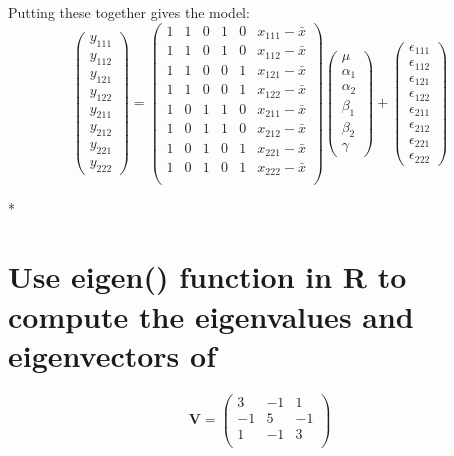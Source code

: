 \documentclass[11pt]{article}
\begin{document}
Putting these together gives the model:
\[
\begin{pmatrix} y_{111} \\ y_{112} \\  y_{121}
\\ y_{122} \\ y_{211} \\ y_{212} \\ y_{221} \\ y_{222}
\end{pmatrix} =  
\begin{pmatrix}{}
  1  & 1  & 0  & 1  & 0  & x_{111} -\bar{x}\\ 
  1  & 1  & 0  & 1  & 0  & x_{112} -\bar{x}\\ 
  1  & 1  & 0  & 0  & 1  & x_{121} -\bar{x}\\ 
  1  & 1  & 0  & 0  & 1  & x_{122} -\bar{x}\\ 
  1  & 0  & 1  & 1  & 0  & x_{211} -\bar{x}\\ 
  1  & 0  & 1  & 1  & 0  & x_{212} -\bar{x}\\ 
  1  & 0  & 1  & 0  & 1  & x_{221} -\bar{x}\\ 
  1  & 0  & 1  & 0  & 1  & x_{222} -\bar{x}\\ 
  \end{pmatrix}
\begin{pmatrix} \mu \\ \alpha_1 \\ \alpha_2
\\ \beta_1 \\ \beta_2 \\ \gamma \end{pmatrix} + 
\begin{pmatrix} \epsilon_{111} \\ \epsilon_{112} \\  \epsilon_{121}
\\ \epsilon_{122} \\ \epsilon_{211} \\ \epsilon_{212}
\\ \epsilon_{221} \\ \epsilon_{222} \end{pmatrix}
\]

*  \section{Use eigen() function in R to compute the eigenvalues and eigenvectors of} 

\[
\mathbf{V} =
\begin{pmatrix}{}
  3 & -1 & 1 \\ 
  -1 & 5 & -1 \\ 
  1 & -1 & 3 \\ 
  \end{pmatrix} 
\]
\end{document}
